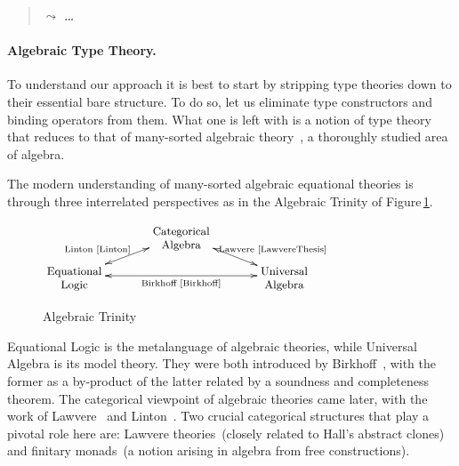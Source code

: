 \documentclass[11pt,twocolumn]{article}
\newcommand{\note}[1]%
{\begin{quote}{\color{blue}$\leadsto$ \bf\em #1}\end{quote}}
\newcommand{\vfigspace}[1]{}%
\begin{document}
\note{\ldots}

\setcounter{paragraph}{0}
\paragraph{Algebraic Type Theory.}
\label{AlgebraicTypeTheoryParagraph}

To understand our approach it is best to start by stripping type theories
down to their essential bare structure.  To do so, let us eliminate type
constructors and binding operators from them.  What one is left with is a
notion of type theory that reduces to that of many-sorted algebraic
theory~\cite{Birkhoff}, a thoroughly studied area of algebra.

The modern understanding of many-sorted algebraic equational theories is
through three interrelated perspectives as in the Algebraic Trinity of
Figure\,\ref{AlgebraicTrinity}.
\vfigspace{-2mm}\begin{figure}[h]
  \caption{Algebraic Trinity}
  \vspace*{2mm}
  \begin{center}$\xymatrix@R=7.5pt@C=35pt{
      & \txt{\small Categorical\\ \small Algebra} 
      \ar@{<->}[dr]^(.55){\null\hspace*{5mm}\txt{\scriptsize Lawvere~\cite{LawvereThesis}}}
      \ar@{<->}[dl]_(.55){\null\hspace*{-10mm}\txt{\scriptsize Linton~\cite{Linton}}}
      & 
      \\
      \txt{\small Equational\\ \small Logic}
      \ar@{<->}[rr]_-{\txt{\scriptsize Birkhoff~\cite{Birkhoff}}}
      &
      & 
      \txt{\small Universal\\ \small Algebra} 
    }$\end{center}
  \vspace*{-2mm}
\label{AlgebraicTrinity}
\end{figure}\vfigspace{-2mm}
Equational Logic is the metalanguage of algebraic theories, while
Universal Algebra is its model theory.  They were both introduced by
Birkhoff~\cite{Birkhoff}, with the former as a by-product of the latter
related by a soundness and completeness theorem.  The categorical
viewpoint of algebraic theories came later, with the work of
Lawvere~\cite{LawvereThesis} and Linton~\cite{Linton}.  Two crucial
categorical structures that play a pivotal role here are: Lawvere
theories~(closely related to Hall's abstract clones) and finitary
monads~(a notion 
arising in algebra from free constructions).
\end{document}
